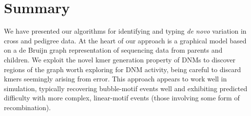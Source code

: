 \section{Summary}

We have presented our algorithms for identifying and typing \textit{de novo} variation in cross and pedigree data.  At the heart of our approach is a graphical model based on a de Bruijn graph representation of sequencing data from parents and children.  We exploit the novel kmer generation property of DNMs to discover regions of the graph worth exploring for DNM activity, being careful to discard kmers seemingly arising from error.  This approach appears to work well in simulation, typically recovering bubble-motif events well and exhibiting predicted difficulty with more complex, linear-motif events (those involving some form of recombination).
